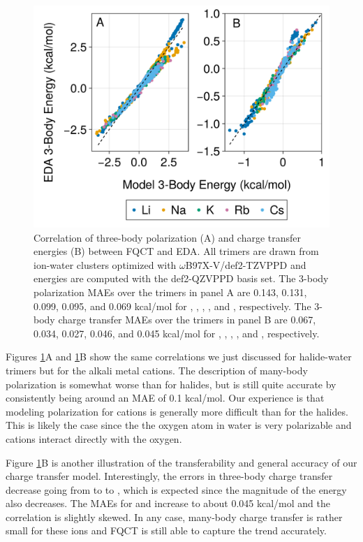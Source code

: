 \documentclass[journal=jacsat,manuscript=article]{achemso}
\begin{document}
\begin{figure}[h]
  \includegraphics*[width=\textwidth]{figures/three_body_pol_and_ct_cations.png}
  \caption{Correlation of three-body polarization (A) and charge transfer energies (B)
  between FQCT and EDA. All trimers are drawn from ion-water clusters optimized
  with $\omega$B97X-V/def2-TZVPPD and energies are computed with the def2-QZVPPD basis set.
  The 3-body polarization MAEs over the trimers in panel A are 0.143, 0.131, 0.099,
  0.095, and 0.069 kcal/mol for , , , , and ,
  respectively. The 3-body charge transfer MAEs over the trimers in panel B are
  0.067, 0.034, 0.027, 0.046, and 0.045 kcal/mol for , , , , and ,
  respectively.
}
  \label{fig:alkali_3b}
\end{figure}

Figures \ref{fig:alkali_3b}A and \ref{fig:alkali_3b}B show the same correlations we just discussed for halide-water trimers but for the alkali metal cations. The description of many-body polarization is somewhat worse than for halides, but is still quite accurate by consistently being around an MAE of 0.1 kcal/mol. Our experience is that modeling polarization for cations is generally more difficult than for the halides. This is likely the case since the the oxygen atom in water is very polarizable and cations interact directly with the oxygen.

Figure \ref{fig:alkali_3b}B is another illustration of the transferability and general accuracy of our charge transfer model. Interestingly, the errors in three-body charge transfer decrease going from  to  to , which is expected since the magnitude of the energy also decreases. The MAEs for  and  increase to about 0.045 kcal/mol and the correlation is slightly skewed. In any case, many-body charge transfer is rather small for these ions and FQCT is still able to capture the trend accurately.
\end{document}
